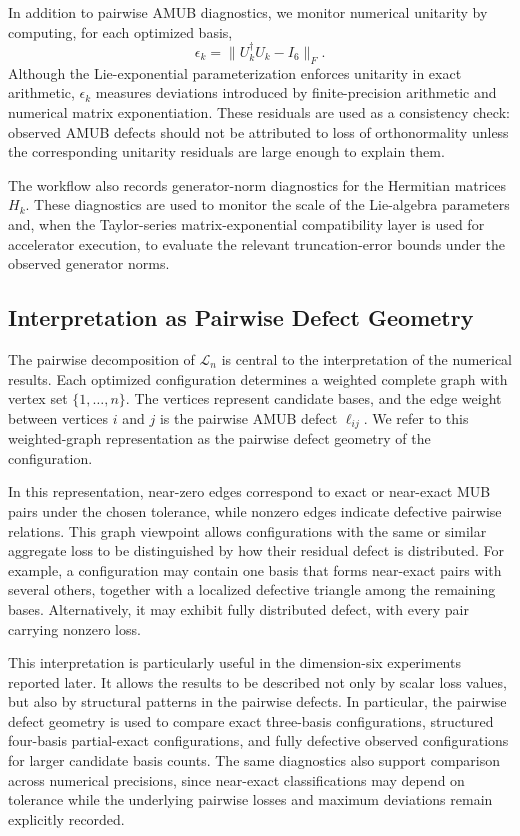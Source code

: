 \documentclass[a4paper,twocolumn,11pt,amsfonts,amssymb]{quantumarticle}
\begin{document}
In addition to pairwise AMUB diagnostics, we monitor numerical unitarity by computing, for each optimized basis,
\begin{equation}
    \epsilon_k
    =
    \|U_k^\dagger U_k - I_6\|_F .
    \label{eq:unitarity-residual}
\end{equation}
Although the Lie-exponential parameterization enforces unitarity in exact arithmetic, \(\epsilon_k\) measures deviations introduced by finite-precision arithmetic and numerical matrix exponentiation. These residuals are used as a consistency check: observed AMUB defects should not be attributed to loss of orthonormality unless the corresponding unitarity residuals are large enough to explain them.

The workflow also records generator-norm diagnostics for the Hermitian matrices \(H_k\). These diagnostics are used to monitor the scale of the Lie-algebra parameters and, when the Taylor-series matrix-exponential compatibility layer is used for accelerator execution, to evaluate the relevant truncation-error bounds under the observed generator norms.

\subsection{Interpretation as Pairwise Defect Geometry}

The pairwise decomposition of \(\mathcal{L}_n\) is central to the interpretation of the numerical results. Each optimized configuration determines a weighted complete graph with vertex set \(\{1,\ldots,n\}\). The vertices represent candidate bases, and the edge weight between vertices \(i\) and \(j\) is the pairwise AMUB defect \(\ell_{ij}\). We refer to this weighted-graph representation as the pairwise defect geometry of the configuration.

In this representation, near-zero edges correspond to exact or near-exact MUB pairs under the chosen tolerance, while nonzero edges indicate defective pairwise relations. This graph viewpoint allows configurations with the same or similar aggregate loss to be distinguished by how their residual defect is distributed. For example, a configuration may contain one basis that forms near-exact pairs with several others, together with a localized defective triangle among the remaining bases. Alternatively, it may exhibit fully distributed defect, with every pair carrying nonzero loss.

This interpretation is particularly useful in the dimension-six experiments reported later. It allows the results to be described not only by scalar loss values, but also by structural patterns in the pairwise defects. In particular, the pairwise defect geometry is used to compare exact three-basis configurations, structured four-basis partial-exact configurations, and fully defective observed configurations for larger candidate basis counts. The same diagnostics also support comparison across numerical precisions, since near-exact classifications may depend on tolerance while the underlying pairwise losses and maximum deviations remain explicitly recorded.
\end{document}
